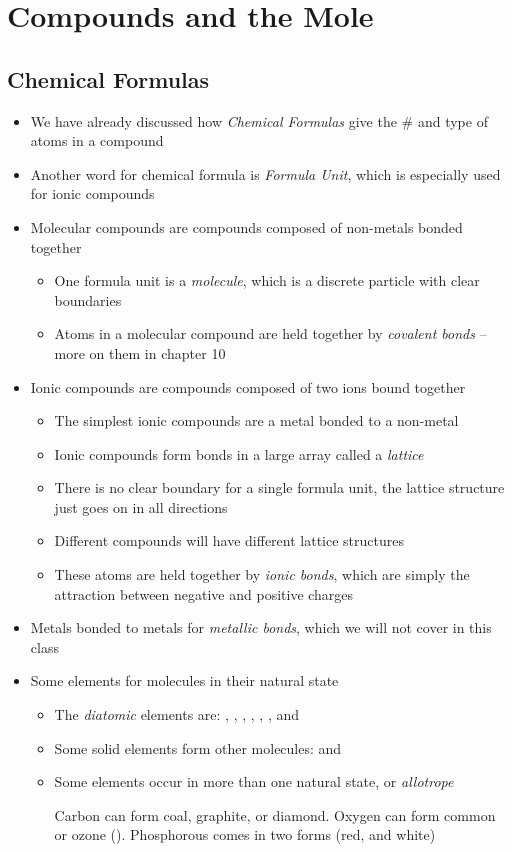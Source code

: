 \documentclass[12pt, openany, letterpaper]{memoir}
\begin{document}
\chapter{Compounds and the Mole}
\section{Chemical Formulas}
\begin{itemize}
	\item We have already discussed how \emph{Chemical Formulas} give the \# and type of atoms in a compound
	\item Another word for chemical formula is \emph{Formula Unit}, which is especially used for ionic compounds
	\item Molecular compounds are compounds composed of non-metals bonded together
	\begin{itemize}
		\item One formula unit is a \emph{molecule}, which is a discrete particle with clear boundaries
		\item Atoms in a molecular compound are held together by \emph{covalent bonds} -- more on them in chapter 10
	\end{itemize}
	\item Ionic compounds are compounds composed of two ions bound together
	\begin{itemize}
		\item The simplest ionic compounds are a metal bonded to a non-metal
		\item Ionic compounds form bonds in a large array called a \emph{lattice}
		\item There is no clear boundary for a single formula unit, the lattice structure just goes on in all directions
		\item Different compounds will have different lattice structures
		\item These atoms are held together by \emph{ionic bonds}, which are simply the attraction between negative and positive charges
	\end{itemize}
	\item Metals bonded to metals for \emph{metallic bonds}, which we will not cover in this class
	\item Some elements for molecules in their natural state
	\begin{itemize}
		\item The \emph{diatomic} elements are: , , , , , , and 
		\item Some solid elements form other molecules:  and 
		\item Some elements occur in more than one natural state, or \emph{allotrope}
		
		Carbon can form coal, graphite, or diamond. Oxygen can form common  or ozone (). Phosphorous comes in two forms (red, and white)
	\end{itemize}
\end{itemize}
\end{document}
